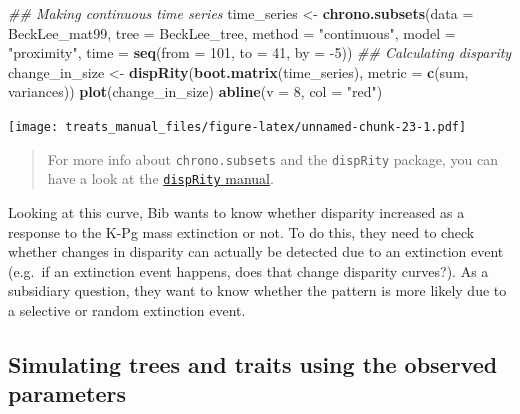 \documentclass[
]{book}
\newenvironment{Shaded}{\begin{snugshade}}{\end{snugshade}}
\newcommand{\CommentTok}[1]{\textcolor[rgb]{0.56,0.35,0.01}{\textit{#1}}}
\newcommand{\DataTypeTok}[1]{\textcolor[rgb]{0.13,0.29,0.53}{#1}}
\newcommand{\DecValTok}[1]{\textcolor[rgb]{0.00,0.00,0.81}{#1}}
\newcommand{\KeywordTok}[1]{\textcolor[rgb]{0.13,0.29,0.53}{\textbf{#1}}}
\newcommand{\NormalTok}[1]{#1}
\newcommand{\StringTok}[1]{\textcolor[rgb]{0.31,0.60,0.02}{#1}}
\begin{document}
\begin{Shaded}
\begin{Highlighting}[]
\CommentTok{\#\# Making continuous time series}
\NormalTok{time\_series \textless{}{-}}\StringTok{ }\KeywordTok{chrono.subsets}\NormalTok{(}\DataTypeTok{data =}\NormalTok{ BeckLee\_mat99,}
                              \DataTypeTok{tree =}\NormalTok{ BeckLee\_tree,}
                              \DataTypeTok{method =} \StringTok{"continuous"}\NormalTok{, }\DataTypeTok{model =} \StringTok{"proximity"}\NormalTok{,}
                              \DataTypeTok{time =} \KeywordTok{seq}\NormalTok{(}\DataTypeTok{from =} \DecValTok{101}\NormalTok{, }\DataTypeTok{to =} \DecValTok{41}\NormalTok{, }\DataTypeTok{by =} \DecValTok{{-}5}\NormalTok{))}
\CommentTok{\#\# Calculating disparity}
\NormalTok{change\_in\_size \textless{}{-}}\StringTok{ }\KeywordTok{dispRity}\NormalTok{(}\KeywordTok{boot.matrix}\NormalTok{(time\_series), }\DataTypeTok{metric =} \KeywordTok{c}\NormalTok{(sum, variances))}
\KeywordTok{plot}\NormalTok{(change\_in\_size)}
\KeywordTok{abline}\NormalTok{(}\DataTypeTok{v =} \DecValTok{8}\NormalTok{, }\DataTypeTok{col =} \StringTok{"red"}\NormalTok{)}
\end{Highlighting}
\end{Shaded}

\texttt{[image: treats\_manual\_files/figure-latex/unnamed-chunk-23-1.pdf]}

\begin{quote}
For more info about \texttt{chrono.subsets} and the \texttt{dispRity} package, you can have a look at the \href{http://tguillerme.github.io/dispRity.html}{\texttt{dispRity} manual}.
\end{quote}

Looking at this curve, Bib wants to know whether disparity increased as a response to the K-Pg mass extinction or not.
To do this, they need to check whether changes in disparity can actually be detected due to an extinction event (e.g.~if an extinction event happens, does that change disparity curves?).
As a subsidiary question, they want to know whether the pattern is more likely due to a selective or random extinction event.

\hypertarget{simulating-trees-and-traits-using-the-observed-parameters}{%
\subsection{Simulating trees and traits using the observed parameters}\label{simulating-trees-and-traits-using-the-observed-parameters}}
\end{document}
